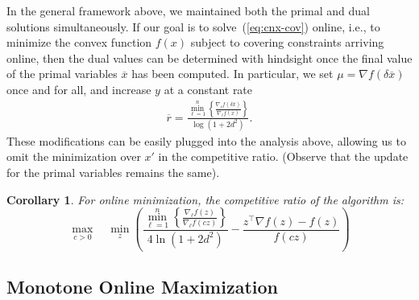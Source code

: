\documentclass[letterpaper,11pt]{article}
\newtheorem{cor}[thm]{Corollary}
\newcommand{\ox}{\ensuremath{\overline{x}}\xspace}
\newcommand{\trans}{\intercal}
\def\ox{\overline{x}}
\begin{document}
In the general framework above, we maintained both the primal and dual
solutions simultaneously. If our goal is to solve~(\ref{eq:cnx-cov})
online, i.e., to minimize the convex function $f(x)$ subject to covering
constraints arriving online, then the dual values can be determined with
hindsight once the final value of the primal variables $\ox$ has been
computed. In particular, we set $\mu = \nabla f(\delta \ox)$ once and
for all, and increase $y$ at a constant rate
\begin{gather*}
  \overline{r} = \frac{\min_{\ell=1}^{n}\left\{\frac{\nabla_\ell
        f(\delta \ox)}{\nabla_\ell f(\ox)}\right\}}{\log\left(1+
      2d^2\right)}.
\end{gather*}
These modifications can be easily plugged into the analysis above,
allowing us to omit the minimization over $x'$ in the competitive ratio.
(Observe that the update for the primal variables remains the same).

\begin{cor}
For online minimization, the competitive ratio of the algorithm is:
\begin{equation}
\max_{c>0} \quad \min_{z} \left(\frac{\min_{\ell=1}^{n}\left\{\frac{\nabla_\ell f( z)}{\nabla_\ell f(cz)}\right\}}{4\ln(1+2d^2)} - \frac{ z^\trans \nabla f( z) - f( z) }{f(cz)}\right)
\end{equation}
\end{cor}

\subsection{Monotone Online Maximization}
\label{sec:monotone}
\end{document}
